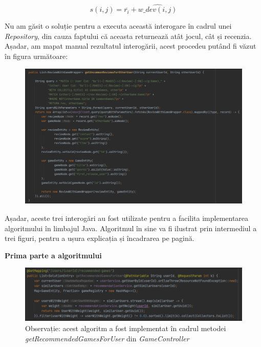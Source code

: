 \documentclass[12pt,a4paper]{report}
\begin{document}
\[  s(i,j) = \overline{r_i} + \hat{w\_dev(i,j)}  \]

Nu am găsit o soluție pentru a executa această interogare în cadrul unei \emph{Repository}, din cauza faptului că aceasta returnează atât jocul, cât și recenzia. Așadar, am mapat manual rezultatul interogării, acest procedeu putând fi văzut în figura următoare:

\begin{figure}[H]
\centering
\caption{}
\begin{adjustbox}{max size={\textwidth}{\textheight}}
\includegraphics[scale = 0.6]{exemplu_26_third_query}
\end{adjustbox}
\caption*{}
\end{figure}

Așadar, aceste trei interogări au fost utilizate pentru a facilita implementarea algoritmului în limbajul Java.
Algoritmul în sine va fi ilustrat prin intermediul a trei figuri, pentru a ușura explicația și încadrarea pe pagină.

\bigskip
\textbf{Prima parte a algoritmului}
\bigskip

\begin{figure}[H]
\centering
\caption{}
\begin{adjustbox}{max size={\textwidth}{\textheight}}
\includegraphics[scale = 0.7]{exemplu_27_first_part}
\end{adjustbox}
\caption*{Observație: acest algoritm a fost implementat în cadrul metodei \emph{getRecommendedGamesForUser} din \emph{GameController}}
\end{figure}
\end{document}
